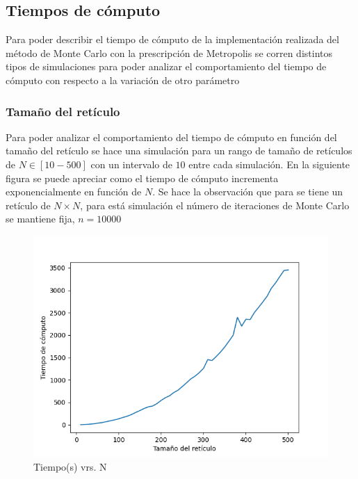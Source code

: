 \documentclass[a4paper]{article}
\begin{document}
\subsection{Tiempos de cómputo}
Para poder describir el tiempo de cómputo de la implementación realizada del método de Monte Carlo con la prescripción de Metropolis se corren distintos tipos de simulaciones para poder analizar el comportamiento del tiempo de cómputo con respecto a la variación de otro parámetro
\subsubsection{Tamaño del retículo}
Para poder analizar el comportamiento del tiempo de cómputo en función del tamaño del retículo se hace una simulación para un rango de tamaño de retículos de $N\in[10-500]$ con un intervalo de $10$ entre cada simulación. En la siguiente figura se puede apreciar como el tiempo de cómputo incrementa exponencialmente en función de $N$. Se hace la observación que para se tiene un retículo de $N\times N$, para está simulación el número de iteraciones de Monte Carlo se mantiene fija, $n=10000$
\begin{figure}[H]
\begin{center}
\includegraphics[scale=0.64]{time_vrs_lattice_size.png} 
\end{center} 
\caption{Tiempo(s) vrs. N}
\end{figure}
\end{document}
